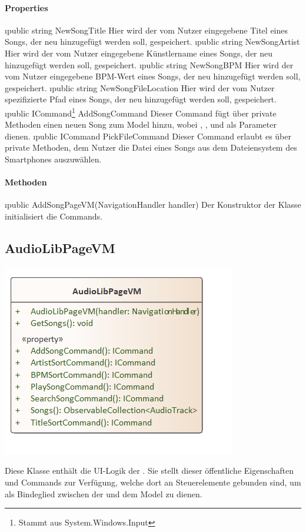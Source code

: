 \documentclass[../entwurf.tex]{subfiles}
\begin{document}
\paragraph{Properties}
\begin{itemize}
	\i{public string NewSongTitle} Hier wird der vom Nutzer eingegebene Titel eines Songs, der neu hinzugefügt werden soll, gespeichert.
	\i{public string NewSongArtist} Hier wird der vom Nutzer eingegebene Künstlername eines Songs, der neu hinzugefügt werden soll, gespeichert.
	\i{public string NewSongBPM} Hier wird der vom Nutzer eingegebene BPM-Wert eines Songs, der neu hinzugefügt werden soll, gespeichert.
	\i{public string NewSongFileLocation} Hier wird der vom Nutzer spezifizierte Pfad eines Songs, der neu hinzugefügt werden soll, gespeichert.
	\i{public ICommand\footnote{Stammt aus System.Windows.Input} AddSongCommand} Dieser Command fügt über private Methoden einen neuen Song zum Model hinzu, wobei , ,  und  als Parameter dienen. 
	\i{public ICommand PickFileCommand} Dieser Command erlaubt es über private Methoden, dem Nutzer die Datei eines Songs aus dem Dateiensystem des Smartphones auszuwählen. 
\end{itemize}
\paragraph{Methoden}
\begin{itemize}
	\i{public AddSongPageVM(NavigationHandler handler)} Der Konstruktor der Klasse initialisiert die Commands.
\end{itemize}
\subsection{AudioLibPageVM}
\begin{minipage}{0.5\textwidth}
\includegraphics[scale=0.75]{../graphics/vm_klassen/AudioLibPageVM.png}
\end{minipage}
\begin{minipage}{0.5\textwidth}
 \newline
Diese Klasse enthält die UI-Logik der . Sie stellt dieser öffentliche Eigenschaften und Commands zur Verfügung, welche dort an Steuerelemente gebunden sind, um als Bindeglied zwischen der  und dem Model zu dienen.
\end{minipage}
\end{document}
